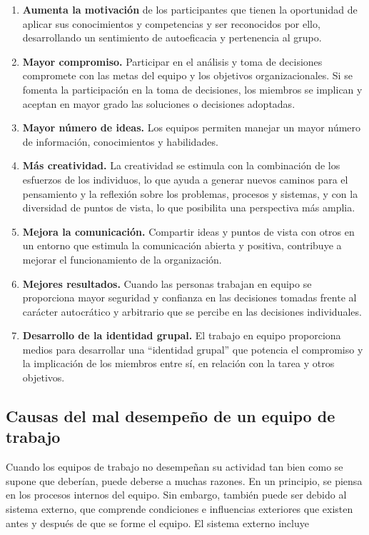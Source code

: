 \begin{enumerate}
    \item \textbf{Aumenta la motivación} de los participantes que tienen la oportunidad de aplicar sus
    conocimientos y competencias y ser reconocidos por ello, desarrollando un sentimiento de
    autoeficacia y pertenencia al grupo.

    \item \textbf{Mayor compromiso.} Participar en el análisis y toma de decisiones compromete con las
    metas del equipo y los objetivos organizacionales. Si se fomenta la participación en la toma
    de decisiones, los miembros se implican y aceptan en mayor grado las soluciones o
    decisiones adoptadas.

    \item \textbf{Mayor número de ideas.} Los equipos permiten manejar un mayor número de información,
    conocimientos y habilidades.

    \item \textbf{Más creatividad.} La creatividad se estimula con
    la combinación de los esfuerzos de los
    individuos, lo que ayuda a generar nuevos
    caminos para el pensamiento y la reflexión
    sobre los problemas, procesos y sistemas, y con
    la diversidad de puntos de vista, lo que posibilita
    una perspectiva más amplia.

    \item \textbf{Mejora la comunicación.} Compartir ideas y
    puntos de vista con otros en un entorno que
    estimula la comunicación abierta y positiva,
    contribuye a mejorar el funcionamiento de la
    organización.
    
    \item \textbf{Mejores resultados.} Cuando las personas
    trabajan en equipo se proporciona mayor seguridad y confianza en las decisiones tomadas
    frente al carácter autocrático y arbitrario que se percibe en las decisiones individuales.

    \item \textbf{Desarrollo de la identidad grupal.} El trabajo en equipo proporciona medios para
    desarrollar una “identidad grupal” que potencia el compromiso y la implicación de los
    miembros entre sí, en relación con la tarea y otros objetivos.
\end{enumerate}

\subsection{Causas del mal desempeño de un equipo de trabajo}
Cuando los equipos de trabajo no desempeñan su actividad tan bien como se
supone que deberían, puede deberse a muchas razones. En un principio, se
piensa en los procesos internos del equipo. Sin embargo, también puede
ser debido al sistema externo, que comprende condiciones e influencias
exteriores que existen antes y después de que se forme el equipo. El
sistema externo incluye
